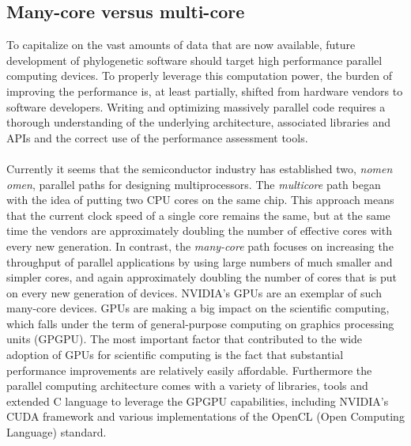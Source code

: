 \subsection{Many-core versus multi-core}

To capitalize on the vast amounts of data that are now available, future development of phylogenetic software should target high performance parallel computing devices.
To properly leverage this computation power, the burden of improving the performance is, at least partially, shifted from hardware vendors to software developers.
Writing and optimizing massively parallel code requires a thorough understanding of the underlying architecture, associated libraries and APIs and the correct use of the performance assessment tools.

\paragraph{}
Currently it seems that the semiconductor industry has established two, \textit{nomen omen}, parallel paths for designing multiprocessors.
The \textit{multicore} path began with the idea of putting two CPU cores on the same chip.
This approach means that the current clock speed of a single core remains the same, but at the same time the vendors are approximately doubling the number of effective cores with every new generation.
In contrast, the \textit{many-core} path focuses on increasing the throughput of parallel applications by using large numbers of much smaller and simpler cores, and again approximately doubling the number of cores that is put on every new generation of devices. 
NVIDIA's GPUs are an exemplar of such many-core devices.
GPUs \citep{Nickolls2008} are making a big impact on the scientific computing, which falls under the term of general-purpose computing on graphics processing units (GPGPU).
The most important factor that contributed to the wide adoption of GPUs for scientific computing is the fact that substantial performance improvements are relatively easily affordable. 
Furthermore the parallel computing architecture comes with a variety of libraries, tools and extended C language to leverage the GPGPU capabilities, including NVIDIA's CUDA framework and various implementations of the OpenCL (Open Computing Language) standard.


